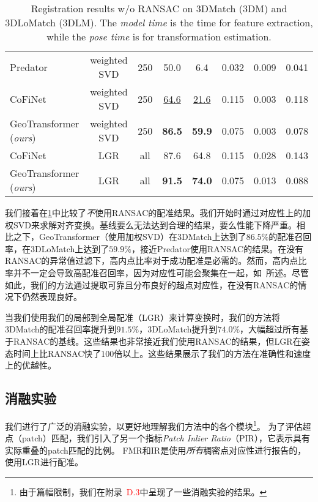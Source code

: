 \begin{table}[!t]
\begin{tabular}{l|c|c|cc|ccc}
  Predator~\cite{huang2021predator} & weighted SVD & 250 & 50.0 & 6.4 & 0.032 & 0.009 & 0.041 \\  %
  CoFiNet~\cite{yu2021cofinet} & weighted SVD & 250 & \underline{64.6} & \underline{21.6} & 0.115 & 0.003 & 0.118 \\
  GeoTransformer (\emph{ours}) & weighted SVD & 250 & \textbf{86.5} & \textbf{59.9} & 0.075 & 0.003 & 0.078 \\
  \midrule
  CoFiNet~\cite{yu2021cofinet} & LGR & all & 87.6 & 64.8 & 0.115 & 0.028 & 0.143 \\
  GeoTransformer (\emph{ours}) & LGR & all & \textbf{91.5} & \textbf{74.0} & 0.075 & 0.013 & 0.088 \\
  \bottomrule
  \end{tabular}
  \vspace{-5pt}
  \caption{
  Registration results w/o RANSAC on 3DMatch (3DM) and 3DLoMatch (3DLM).
  The \emph{model time} is the time for feature extraction, while the \emph{pose time} is for transformation estimation.
  }
  \label{table:direct}
  \end{table}
  
我们接着在\ref{table:direct}中比较了\emph{不}使用RANSAC的配准结果。我们开始时通过对应性上的加权SVD来求解对齐变换。基线要么无法达到合理的结果，要么性能下降严重。相比之下，GeoTransformer（使用加权SVD）在3DMatch上达到了$86.5\%$的配准召回率，在3DLoMatch上达到了$59.9\%$，接近Predator使用RANSAC的结果。在没有RANSAC的异常值过滤下，高内点比率对于成功配准是必需的。然而，高内点比率并不一定会导致高配准召回率，因为对应性可能会聚集在一起，如~\cite{huang2021predator}所述。尽管如此，我们的方法通过提取可靠且分布良好的超点对应性，在没有RANSAC的情况下仍然表现良好。

当我们使用我们的局部到全局配准（LGR）来计算变换时，我们的方法将3DMatch的配准召回率提升到$91.5\%$，3DLoMatch提升到$74.0\%$，大幅超过所有基于RANSAC的基线。这些结果也非常接近我们使用RANSAC的结果，但LGR在姿态时间上比RANSAC快了$100$倍以上。这些结果展示了我们的方法在准确性和速度上的优越性。



\subsection{消融实验}
\label{sec:exp-ablation}
我们进行了广泛的消融实验，以更好地理解我们方法中的各个模块\footnote{由于篇幅限制，我们在附录~\textcolor{red}{D.3}中呈现了一些消融实验的结果。}。
为了评估超点（patch）匹配，我们引入了另一个指标\emph{Patch Inlier Ratio}（PIR），它表示具有实际重叠的patch匹配的比例。
FMR和IR是使用\emph{所有}稠密点对应性进行报告的，使用LGR进行配准。

